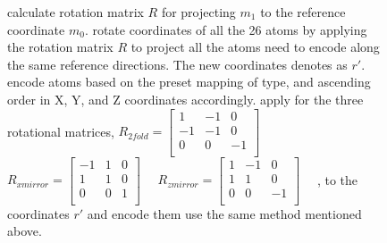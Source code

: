 \begin{figure}[!htb]
\begin{minipage}{.7\linewidth}
\begin{algorithm}[H]
\begin{algorithmic}[1]
        \State calculate rotation matrix $R$ for projecting $m_1$ to the reference coordinate $m_0$. 
        \State rotate coordinates of all the 26 atoms by applying the rotation matrix $R$ to project all the atoms need to encode along the same reference directions. The new coordinates denotes as $r'$. 
        \State encode atoms based on the preset mapping of type, and ascending order in X, Y, and Z coordinates accordingly.
        \State apply for the three rotational matrices, 
        $R_{2 fold} = \begin{bmatrix} 1 & -1 & 0 \\
                                      -1 & -1 & 0 \\
                                      0 & 0 & -1 \\
        \end{bmatrix}\quad$
        $R_{x mirror} = \begin{bmatrix} -1 & 1 & 0 \\
                                         1 & 1 & 0 \\
                                         0 & 0 & 1 \\
        \end{bmatrix}\quad$
        $R_{z mirror} = \begin{bmatrix} 1 & -1 & 0 \\
                                        1 & 1 & 0 \\
                                        0 & 0 & -1 \\
        \end{bmatrix}\quad$
        , to the coordinates $r'$ and encode them use the same method mentioned above.
        
      \end{algorithmic}
    \end{algorithm}
  \end{minipage}
\end{figure}



